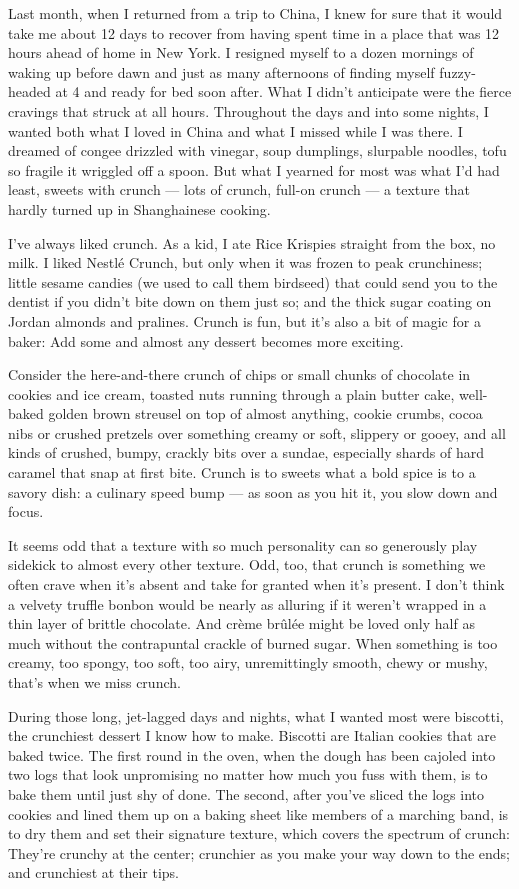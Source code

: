 Last month, when I returned from a trip to China, I knew for sure that
it would take me about 12 days to recover from having spent time in a
place that was 12 hours ahead of home in New York. I resigned myself to
a dozen mornings of waking up before dawn and just as many afternoons of
finding myself fuzzy-headed at 4 and ready for bed soon after. What I
didn't anticipate were the fierce cravings that struck at all hours.
Throughout the days and into some nights, I wanted both what I loved in
China and what I missed while I was there. I dreamed of congee drizzled
with vinegar, soup dumplings, slurpable noodles, tofu so fragile it
wriggled off a spoon. But what I yearned for most was what I'd had
least, sweets with crunch --- lots of crunch, full-on crunch --- a
texture that hardly turned up in Shanghainese cooking.

I've always liked crunch. As a kid, I ate Rice Krispies straight from
the box, no milk. I liked Nestlé Crunch, but only when it was frozen to
peak crunchiness; little sesame candies (we used to call them birdseed)
that could send you to the dentist if you didn't bite down on them just
so; and the thick sugar coating on Jordan almonds and pralines. Crunch
is fun, but it's also a bit of magic for a baker: Add some and almost
any dessert becomes more exciting.

Consider the here-and-there crunch of chips or small chunks of chocolate
in cookies and ice cream, toasted nuts running through a plain butter
cake, well-baked golden brown streusel on top of almost anything, cookie
crumbs, cocoa nibs or crushed pretzels over something creamy or soft,
slippery or gooey, and all kinds of crushed, bumpy, crackly bits over a
sundae, especially shards of hard caramel that snap at first bite.
Crunch is to sweets what a bold spice is to a savory dish: a culinary
speed bump --- as soon as you hit it, you slow down and focus.

It seems odd that a texture with so much personality can so generously
play sidekick to almost every other texture. Odd, too, that crunch is
something we often crave when it's absent and take for granted when it's
present. I don't think a velvety truffle bonbon would be nearly as
alluring if it weren't wrapped in a thin layer of brittle chocolate. And
crème brûlée might be loved only half as much without the contrapuntal
crackle of burned sugar. When something is too creamy, too spongy, too
soft, too airy, unremittingly smooth, chewy or mushy, that's when we
miss crunch.

During those long, jet-lagged days and nights, what I wanted most were
biscotti, the crunchiest dessert I know how to make. Biscotti are
Italian cookies that are baked twice. The first round in the oven, when
the dough has been cajoled into two logs that look unpromising no matter
how much you fuss with them, is to bake them until just shy of done. The
second, after you've sliced the logs into cookies and lined them up on a
baking sheet like members of a marching band, is to dry them and set
their signature texture, which covers the spectrum of crunch: They're
crunchy at the center; crunchier as you make your way down to the ends;
and crunchiest at their tips.

